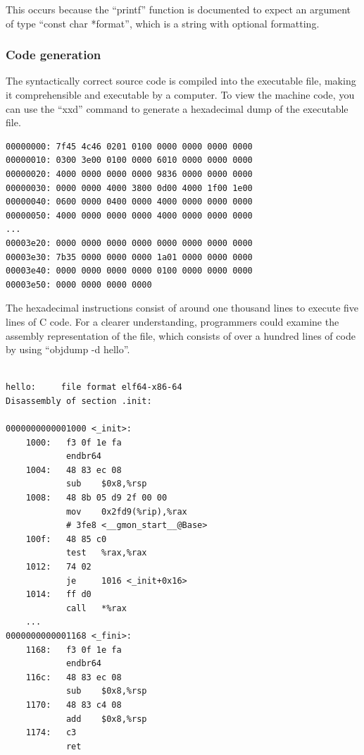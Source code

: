 \documentclass[journal]{IEEEtran}
\begin{document}
This occurs because the ``printf'' function is documented to expect an argument of type ``const char *format'', which is a string with optional formatting. 
\subsubsection{Code generation}
The syntactically correct source code is compiled into the executable file, making it comprehensible and executable by a computer. To view the machine code, you can use the ``xxd'' command to generate a hexadecimal dump of the executable file. 

\begin{lstlisting}[breaklines=true, basicstyle=\footnotesize, frame=single]
00000000: 7f45 4c46 0201 0100 0000 0000 0000 0000
00000010: 0300 3e00 0100 0000 6010 0000 0000 0000
00000020: 4000 0000 0000 0000 9836 0000 0000 0000
00000030: 0000 0000 4000 3800 0d00 4000 1f00 1e00
00000040: 0600 0000 0400 0000 4000 0000 0000 0000 
00000050: 4000 0000 0000 0000 4000 0000 0000 0000 
...
00003e20: 0000 0000 0000 0000 0000 0000 0000 0000
00003e30: 7b35 0000 0000 0000 1a01 0000 0000 0000
00003e40: 0000 0000 0000 0000 0100 0000 0000 0000
00003e50: 0000 0000 0000 0000                    
\end{lstlisting}

The hexadecimal instructions consist of around one thousand lines to execute five lines of C code. For a clearer understanding, programmers could examine the assembly representation of the file, which consists of over a hundred lines of code by using ``objdump -d hello''.

\begin{lstlisting}[breaklines=true, basicstyle=\footnotesize, frame=single]

hello:     file format elf64-x86-64
Disassembly of section .init:

0000000000001000 <_init>:
    1000:   f3 0f 1e fa          	
            endbr64 
    1004:   48 83 ec 08          	
            sub    $0x8,%rsp
    1008:   48 8b 05 d9 2f 00 00 	
            mov    0x2fd9(%rip),%rax
            # 3fe8 <__gmon_start__@Base>
    100f:   48 85 c0             	
            test   %rax,%rax
    1012:   74 02                	
            je     1016 <_init+0x16>
    1014:   ff d0                	
            call   *%rax
    ...
0000000000001168 <_fini>:
    1168:   f3 0f 1e fa          	
            endbr64 
    116c:   48 83 ec 08          	
            sub    $0x8,%rsp
    1170:   48 83 c4 08
            add    $0x8,%rsp
    1174:   c3
            ret  
\end{lstlisting}
\end{document}
